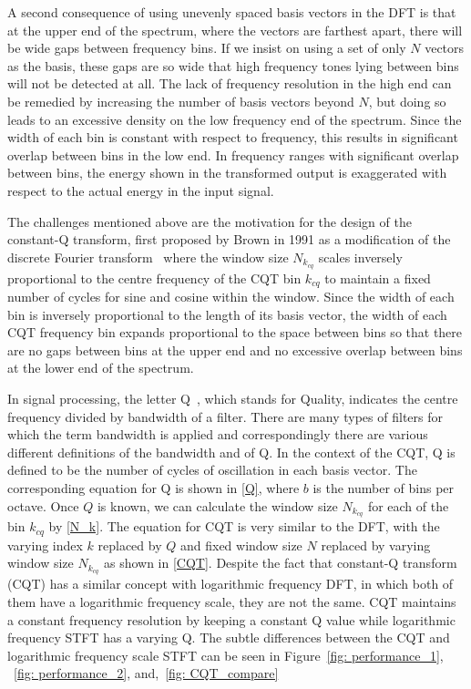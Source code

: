 \documentclass{ieeeaccess}
\begin{document}
A second consequence of using unevenly spaced basis vectors in the DFT is that at the upper end of the spectrum, where the vectors are farthest apart, there will be wide gaps between frequency bins. If we insist on using a set of only $N$ vectors as the basis, these gaps are so wide that high frequency tones lying between bins will not be detected at all.
The lack of frequency resolution in the high end can be remedied by increasing the number of basis vectors beyond $N$, but doing so leads to an excessive density on the low frequency end of the spectrum. Since the width of each bin is constant with respect to frequency, this results in significant overlap between bins in the low end. In frequency ranges with significant overlap between bins, the energy shown in the transformed output is exaggerated with respect to the actual energy in the input signal.


The challenges mentioned above are the motivation for the design of the constant-Q transform, first proposed by Brown in 1991 as a modification of the discrete Fourier transform~\cite{brown1991calculation} where the window size $N_{k_{cq}}$ scales inversely proportional to the centre frequency of the CQT bin $k_{cq}$ to maintain a fixed number of cycles for sine and cosine within the window. Since the width of each bin is inversely proportional to the length of its basis vector, the width of each CQT frequency bin expands proportional to the space between bins so that there are no gaps between bins at the upper end and no excessive overlap between bins at the lower end of the spectrum.


In signal processing, the letter Q~\cite{q-factor}, which stands for Quality, indicates the centre frequency divided by bandwidth of a filter. There are many types of filters for which the term bandwidth is applied and correspondingly there are various different definitions of the bandwidth and of Q. In the context of the CQT, Q is defined to be the number of cycles of oscillation in each basis vector. The corresponding equation for Q is shown in \eqref{Q}, where $b$ is the number of bins per octave. Once $Q$ is known, we can calculate the window size $N_{k_{cq}}$ for each of the bin $k_{cq}$ by \eqref{N_k}. The equation for CQT is very similar to the DFT, with the varying index $k$ replaced by $Q$ and fixed window size $N$ replaced by varying window size $N_{k_{cq}}$ as shown in \eqref{CQT}. Despite the fact that constant-Q transform (CQT) has a similar concept with logarithmic frequency DFT, in which both of them have a logarithmic frequency scale, they are not the same. CQT maintains a constant frequency resolution by keeping a constant Q value while logarithmic frequency STFT has a varying Q. The subtle differences between the CQT and logarithmic frequency scale STFT can be seen in Figure~\ref{fig: performance_1}, ~\ref{fig: performance_2}, and,~\ref{fig: CQT_compare}
\end{document}
